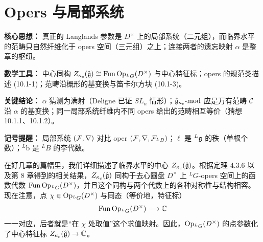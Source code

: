 \section{Opers 与局部系统}

\begin{keypoints}
    \item \textbf{核心思想：} 真正的 Langlands 参数是 $D^\times$ 上的局部系统（二元组），而临界水平的范畴只自然纤维化于 opers 空间（三元组）之上；连接两者的遗忘映射 $\alpha$ 是整章的枢纽。
    \item \textbf{数学工具：} 中心同构 $Z_{\kappa_c}(\hat{\mathfrak{g}})\cong\operatorname{Fun}\operatorname{Op}_{{}^L G}(D^\times)$ 与中心特征标；opers 的规范类描述 (10.1-1)；范畴沿概形的基变换与笛卡尔方块 (10.1-3)。
    \item \textbf{关键结论：} $\alpha$ 猜测为满射（Deligne 已证 $SL_n$ 情形）；$\hat{\mathfrak{g}}_{\kappa_c}\text{-}\mathrm{mod}$ 应是万有范畴 $\mathcal{C}$ 沿 $\alpha$ 的基变换；同一局部系统纤维内不同 opers 给出的范畴相互等价（猜想 10.1.1、10.1.2）。
    \item \textbf{记号提醒：} 局部系统 $(\mathcal{F},\nabla)$ 对比 oper $(\mathcal{F},\nabla,\mathcal{F}_{{}^L B})$；$\ell$ 是 ${}^L\mathfrak{g}$ 的秩（单根个数）；${}^L\mathrm{b}$ 是 ${}^L B$ 的李代数。
\end{keypoints}

在好几章的篇幅里，我们详细描述了临界水平的中心 $Z_{\kappa_c}(\hat{\mathfrak{g}})$。根据定理 4.3.6 以及第 8 章得到的相关结果，$Z_{\kappa_c}(\hat{\mathfrak{g}})$ 同构于去心圆盘 $D^\times$ 上 ${}^L G$-opers 空间上的函数代数 $\operatorname{Fun}\operatorname{Op}_{{}^L G}(D^\times)$，并且这个同构与两个代数上的各种对称性与结构相容。现在注意，点 $\chi\in\operatorname{Op}_{{}^L G}(D^\times)$ 与同态（等价地，特征标）
\[
    \operatorname{Fun}\operatorname{Op}_{{}^L G}(D^\times)\longrightarrow\mathbb{C}
\]
一一对应，后者就是“在 $\chi$ 处取值”这个求值映射。因此，$\operatorname{Op}_{{}^L G}(D^\times)$ 的点参数化了中心特征标 $Z_{\kappa_c}(\hat{\mathfrak{g}})\to\mathbb{C}$。

